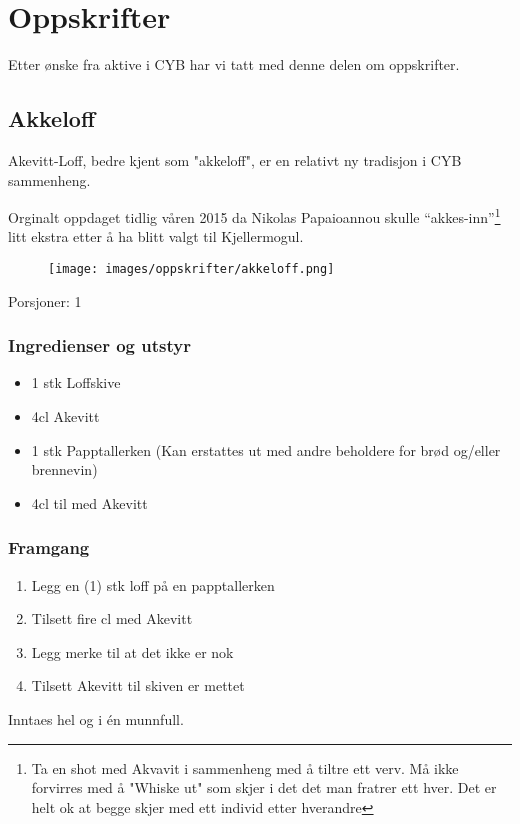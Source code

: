 \chapter*{Oppskrifter}

Etter ønske fra aktive i CYB har vi tatt med denne delen om oppskrifter.

\section*{Akkeloff}

Akevitt-Loff, bedre kjent som "akkeloff", er en relativt ny tradisjon i CYB sammenheng. 

Orginalt oppdaget tidlig våren 2015 da Nikolas Papaioannou skulle ``akkes-inn''\footnote{Ta en shot med Akvavit i sammenheng med å tiltre ett verv. Må ikke forvirres med å "Whiske ut" som skjer i det det man fratrer ett hver. Det er helt ok at begge skjer med ett individ etter hverandre} litt ekstra etter å ha blitt valgt til Kjellermogul.

\begin{figure}[h!]
	\centering
	\texttt{[image: images/oppskrifter/akkeloff.png]}
\end{figure}

Porsjoner: 1

\subsection*{Ingredienser og utstyr}

\begin{itemize}
	\item 1 stk Loffskive
	\item 4cl Akevitt
	\item 1 stk Papptallerken (Kan erstattes ut med andre beholdere for brød og/eller brennevin)
	\item 4cl til med Akevitt
\end{itemize}

\subsection*{Framgang}

\begin{enumerate}
	\item Legg en (1) stk loff på en papptallerken
	\item Tilsett fire cl med Akevitt
	\item Legg merke til at det ikke er nok
	\item Tilsett Akevitt til skiven er mettet
\end{enumerate}

Inntaes hel og i én munnfull. 
